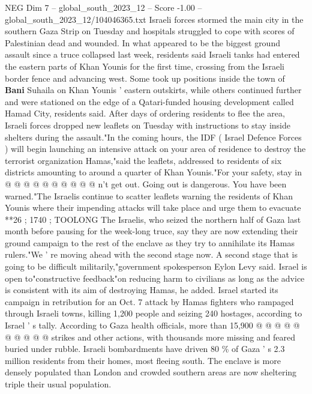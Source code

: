 \begin{textsample}{NEG Dim 7 – global\_south\_2023\_12 – Score -1.00 – global\_south\_2023\_12/104046365.txt}  \label{ex:f7_neg_197}
Israeli forces stormed the main city in the southern Gaza Strip on Tuesday and hospitals struggled to cope with scores of Palestinian dead and wounded.
In what appeared to be the biggest ground assault since a truce collapsed last week, residents said Israeli tanks had entered the eastern parts of Khan Younis for the first time, crossing from the Israeli border fence and advancing west.
Some took up positions inside the town of \textbf{Bani} Suhaila on Khan Younis ' eastern outskirts, while others continued further and were stationed on the edge of a Qatari-funded housing development called Hamad City, residents said.
After days of ordering residents to flee the area, Israeli forces dropped new leaflets on Tuesday with instructions to stay inside shelters during the assault."In the coming hours, the IDF ( Israel Defence Forces ) will begin launching an intensive attack on your area of residence to destroy the terrorist organization Hamas,"said the leaflets, addressed to residents of six districts amounting to around a quarter of Khan Younis."For your safety, stay in @ @ @ @ @ @ @ @ @ @ n't get out.
Going out is dangerous.
You have been warned."The Israelis continue to scatter leaflets warning the residents of Khan Younis where their impending attacks will take place and urge them to evacuate **26 ; 1740 ; TOOLONG The Israelis, who seized the northern half of Gaza last month before pausing for the week-long truce, say they are now extending their ground campaign to the rest of the enclave as they try to annihilate its Hamas rulers."We ' re moving ahead with the second stage now.
A second stage that is going to be difficult militarily,"government spokesperson Eylon Levy said.
Israel is open to"constructive feedback"on reducing harm to civilians as long as the advice is consistent with its aim of destroying Hamas, he added.
Israel started its campaign in retribution for an Oct. 7 attack by Hamas fighters who rampaged through Israeli towns, killing 1,200 people and seizing 240 hostages, according to Israel ' s tally.
According to Gaza health officials, more than 15,900 @ @ @ @ @ @ @ @ @ @ strikes and other actions, with thousands more missing and feared buried under rubble.
Israeli bombardments have driven 80 \% of Gaza ' s 2.3 million residents from their homes, most fleeing south.
The enclave is more densely populated than London and crowded southern areas are now sheltering triple their usual population.

\end{textsample}
